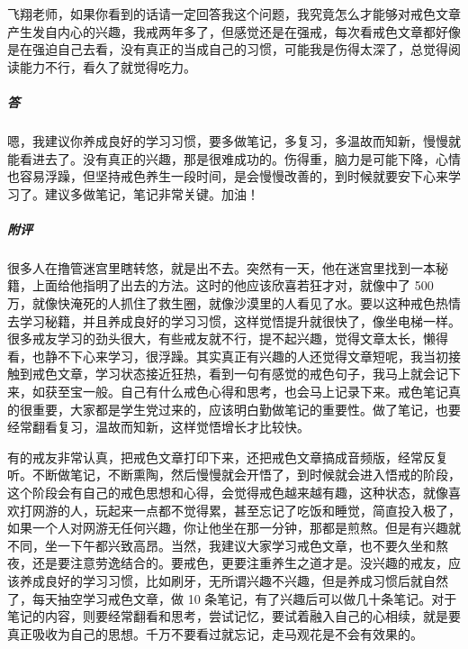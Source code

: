 \begin{case}
    飞翔老师，如果你看到的话请一定回答我这个问题，我究竟怎么才能够对戒色文章产生发自内心的兴趣，我戒两年多了，但感觉还是在强戒，每次看戒色文章都好像是在强迫自己去看，没有真正的当成自己的习惯，可能我是伤得太深了，总觉得阅读能力不行，看久了就觉得吃力。
    \subparagraph{答} 嗯，我建议你养成良好的学习习惯，要多做笔记，多复习，多温故而知新，慢慢就能看进去了。没有真正的兴趣，那是很难成功的。伤得重，脑力是可能下降，心情也容易浮躁，但坚持戒色养生一段时间，是会慢慢改善的，到时候就要安下心来学习了。建议多做笔记，笔记非常关键。加油！
    \subparagraph{附评} 很多人在撸管迷宫里瞎转悠，就是出不去。突然有一天，他在迷宫里找到一本秘籍，上面给他指明了出去的方法。这时的他应该欣喜若狂才对，就像中了 500 万，就像快淹死的人抓住了救生圈，就像沙漠里的人看见了水。要以这种戒色热情去学习秘籍，并且养成良好的学习习惯，这样觉悟提升就很快了，像坐电梯一样。很多戒友学习的劲头很大，有些戒友就不行，提不起兴趣，觉得文章太长，懒得看，也静不下心来学习，很浮躁。其实真正有兴趣的人还觉得文章短呢，我当初接触到戒色文章，学习状态接近狂热，看到一句有感觉的戒色句子，我马上就会记下来，如获至宝一般。自己有什么戒色心得和思考，也会马上记录下来。戒色笔记真的很重要，大家都是学生党过来的，应该明白勤做笔记的重要性。做了笔记，也要经常翻看复习，温故而知新，这样觉悟增长才比较快。

    有的戒友非常认真，把戒色文章打印下来，还把戒色文章搞成音频版，经常反复听。不断做笔记，不断熏陶，然后慢慢就会开悟了，到时候就会进入悟戒的阶段，这个阶段会有自己的戒色思想和心得，会觉得戒色越来越有趣，这种状态，就像喜欢打网游的人，玩起来一点都不觉得累，甚至忘记了吃饭和睡觉，简直投入极了，如果一个人对网游无任何兴趣，你让他坐在那一分钟，那都是煎熬。但是有兴趣就不同，坐一下午都兴致高昂。当然，我建议大家学习戒色文章，也不要久坐和熬夜，还是要注意劳逸结合的。要戒色，更要注重养生之道才是。没兴趣的戒友，应该养成良好的学习习惯，比如刷牙，无所谓兴趣不兴趣，但是养成习惯后就自然了，每天抽空学习戒色文章，做 10 条笔记，有了兴趣后可以做几十条笔记。对于笔记的内容，则要经常翻看和思考，尝试记忆，要试着融入自己的心相续，就是要真正吸收为自己的思想。千万不要看过就忘记，走马观花是不会有效果的。
\end{case}

